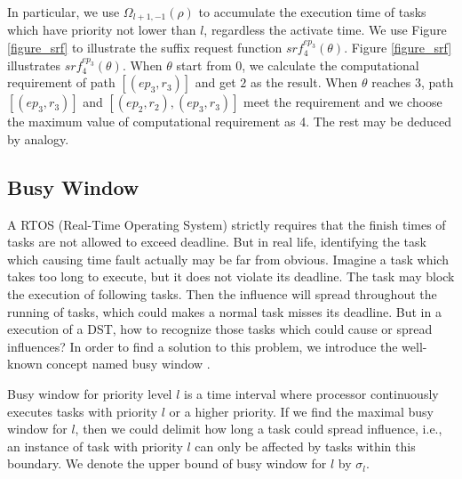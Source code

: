 \documentclass[sigconf]{acmart}
\begin{document}
In particular, we use $\Omega_{l+1,-1}(\rho)$ to accumulate the execution time of tasks which have priority not lower than $l$, regardless the activate time. We use Figure \ref{figure_srf} to illustrate the suffix request function $srf^{ep_3}_{4}(\theta)$. Figure \ref{figure_srf} illustrates $srf^{ep_3}_{4}(\theta)$. When $\theta$ start from 0, we calculate the computational requirement of path $[(ep_3,r_3)]$ and get $2$ as the result. When $\theta$ reaches 3, path $[(ep_3,r_3)]$ and $[(ep_2,r_2),(ep_3,r_3)]$ meet the requirement and we choose the maximum value of computational requirement as 4. The rest may be deduced by analogy.


\subsection{Busy Window}\label{section_busywindow}

A RTOS (Real-Time Operating System) strictly requires that the finish times of tasks are not allowed to exceed deadline. But in real life, identifying the task which causing time fault actually may be far from obvious. Imagine a task which takes too long to execute, but it does not violate its deadline. The task may block the execution of following tasks. Then the influence will spread throughout the running of tasks, which could makes a normal task misses its deadline. But in a execution of a DST, how to recognize those tasks which could cause or spread influences? 
In order to find a solution to this problem, we introduce the well-known concept named busy window \cite{DBLP:conf/rtss/Lehoczky90}. 

Busy window for priority level $l$ is a time interval where processor continuously executes tasks with priority $l$ or a higher priority. If we find the maximal busy window for $l$, then we could delimit how long a task could spread influence, i.e., an instance of task with priority $l$ can only be affected by tasks within this boundary. We denote the upper bound of busy window for $l$ by $\sigma_l$.
\end{document}

